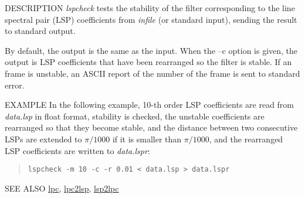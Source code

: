 \begin{synopsis}
\item [lspcheck] [ --m $M$ ] [ --s $S$ ] [ --k ] [ --i $I$ ] [ --o $O$ ]
		[ --r $R$] [ {\em infile} ] 
\end{synopsis}

\begin{qsection}{DESCRIPTION}
{\em lspcheck} tests the stability of the filter 
corresponding to the line spectral pair (LSP) coefficients 
from {\em infile} (or standard input), 
sending the result to standard output.

By default, the output is the same as the input.
When the --c option is given,
the output is LSP coefficients
that have been rearranged so the filter is stable.
If an frame is unstable, an ASCII report of the number of the frame
is sent to standard error.
\end{qsection}

\begin{options}
\end{options}

\begin{qsection}{EXAMPLE}
In the following example, 10-th order LSP coefficients are
read from {\em data.lsp} in float format,
stability is checked, the unstable coefficients are rearranged
so that they become stable, and the distance between two
consecutive LSPs are extended to $\pi /1000$ if
 it is smaller than $\pi /1000$, and the
 rearranged LSP coefficients are written to {\em data.lspr}:
\begin{quote}
\verb!lspcheck -m 10 -c -r 0.01 < data.lsp > data.lspr!
\end{quote}
\end{qsection}

\begin{qsection}{SEE ALSO}
\hyperlink{lpc}{lpc},
\hyperlink{lpc2lsp}{lpc2lsp},
\hyperlink{lsp2lpc}{lsp2lpc}
\end{qsection}
